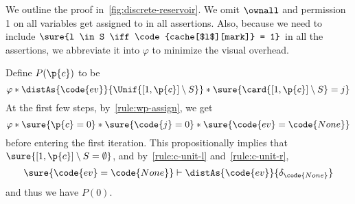 \documentclass[acmsmall,nonacm,screen,appendix]{acmart}
\begin{document}
We outline the proof in~\ref{fig:discrete-reservoir}.
We omit $\ownall$ and permission 1 on all variables get assigned to in all assertions.
Also, because we need to include $\sure{l \in S \iff \code{cache[$l$][mark]} = 1}$
in all the assertions,
we abbreviate it into $\varphi$ to minimize the visual overhead.

Define $P(\p{c})$ to be
\[
  \varphi \ast \distAs{\code{ev}}{\Unif{[1, \p{c}] \setminus S}} \ast \sure{\card{[1, \p{c}] \setminus S} = j}
\]
At the first few steps, by~\ref{rule:wp-assign},
we get
\[
  \varphi \ast \sure{\p{c} = 0} \ast \sure{\code{j} = 0} \ast \sure{\code{ev} = \code{None}}
\]
before entering the first iteration.
This propositionally implies that $\sure{[1, \p{c}] \setminus S = \emptyset}$,
and by~\ref{rule:c-unit-l} and~\ref{rule:c-unit-r},
\[
\sure{\code{ev} = \code{None}} \vdash \distAs{\code{ev}}{\delta_{\code{None}}}
\]
and thus we have $P(0)$.
\end{document}
